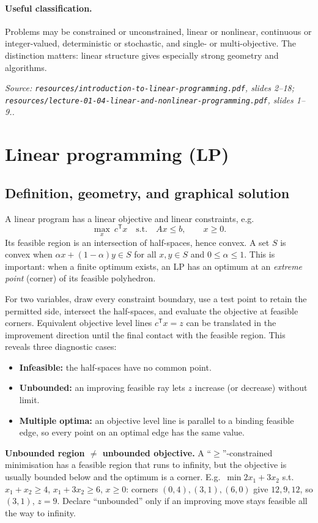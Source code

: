 \documentclass[11pt,a4paper]{article}
\renewcommand{\texttt}[1]{\nolinkurl{#1}}
\newcommand{\T}{\mathsf{T}}
\newcommand{\source}[1]{\par\smallskip\noindent\textit{Source: #1.}\par\smallskip}
\begin{document}
\paragraph{Useful classification.} Problems may be constrained or unconstrained, linear or nonlinear, continuous or integer-valued, deterministic or stochastic, and single- or multi-objective.  The distinction matters: linear structure gives especially strong geometry and algorithms.
\source{\texttt{resources/introduction-to-linear-programming.pdf}, slides 2--18;\\ \texttt{resources/lecture-01-04-linear-and-nonlinear-programming.pdf}, slides 1--9.}

\section{Linear programming (LP)}
\subsection{Definition, geometry, and graphical solution}
A linear program has a linear objective and linear constraints, e.g.
\begin{equation}
 \max_x\ c^\T x\quad\text{s.t.}\quad Ax\leq b,\qquad x\geq0.
\end{equation}
Its feasible region is an intersection of half-spaces, hence convex. A set $S$ is convex when $\alpha x+(1-\alpha)y\in S$ for all $x,y\in S$ and $0\leq\alpha\leq1$.  This is important: when a finite optimum exists, an LP has an optimum at an \emph{extreme point} (corner) of its feasible polyhedron.

For two variables, draw every constraint boundary, use a test point to retain the permitted side, intersect the half-spaces, and evaluate the objective at feasible corners.  Equivalent objective level lines $c^\T x=z$ can be translated in the improvement direction until the final contact with the feasible region. This reveals three diagnostic cases:
\begin{itemize}
 \item \textbf{Infeasible:} the half-spaces have no common point.
 \item \textbf{Unbounded:} an improving feasible ray lets $z$ increase (or decrease) without limit.
 \item \textbf{Multiple optima:} an objective level line is parallel to a binding feasible edge, so every point on an optimal edge has the same value.
\end{itemize}
\textbf{Unbounded region $\neq$ unbounded objective.} A ``$\geq$''-constrained minimisation has a feasible region that runs to infinity, but the objective is usually bounded below and the optimum is a corner. E.g.\ $\min 2x_1+3x_2$ s.t.\ $x_1+x_2\geq4$, $x_1+3x_2\geq6$, $x\geq0$: corners $(0,4),(3,1),(6,0)$ give $12,9,12$, so $(3,1)$, $z=9$. Declare ``unbounded'' only if an improving move stays feasible all the way to infinity.
\end{document}
